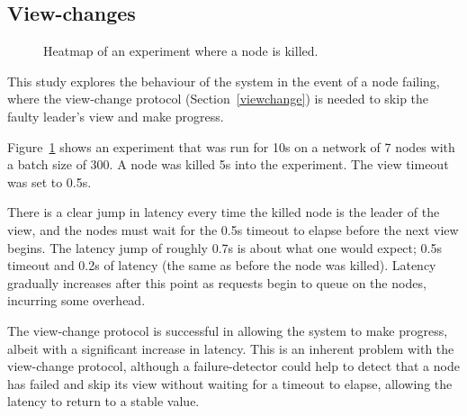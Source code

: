 \subsection{View-changes} \label{viewchangeeval}

\begin{figure}[h!]
\centering
\resizebox{\textwidth}{!}{}
\caption{Heatmap of an experiment where a node is killed.}
\label{viewchangeheatmap}
\end{figure}

This study explores the behaviour of the system in the event of a node failing, where the view-change protocol (Section~\ref{viewchange}) is needed to skip the faulty leader's view and make progress.

Figure~\ref{viewchangeheatmap} shows an experiment that was run for 10s on a network of 7 nodes with a batch size of 300. A node was killed 5s into the experiment. The view timeout was set to 0.5s.

There is a clear jump in latency every time the killed node is the leader of the view, and the nodes must wait for the 0.5s timeout to elapse before the next view begins. The latency jump of roughly 0.7s is about what one would expect; 0.5s timeout and 0.2s of latency (the same as before the node was killed). Latency gradually increases after this point as requests begin to queue on the nodes, incurring some overhead.

The view-change protocol is successful in allowing the system to make progress, albeit with a significant increase in latency. This is an inherent problem with the view-change protocol, although a failure-detector could help to detect that a node has failed and skip its view without waiting for a timeout to elapse, allowing the latency to return to a stable value.










